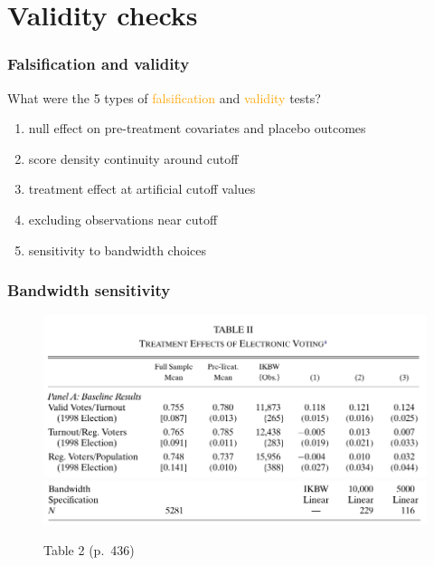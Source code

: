 \documentclass[12pt,english,dvipsnames,aspectratio=169,handout]{beamer}\usepackage[]{graphicx}\usepackage[]{xcolor}
\begin{document}
\section{Validity checks}
 
\begin{frame}
\frametitle{Falsification and validity}

What were the 5 types of \textcolor{orange}{falsification} and \textcolor{orange}{validity} tests?\pause
\bigskip

\begin{enumerate}
\item null effect on pre-treatment covariates and placebo outcomes
\item score density continuity around cutoff
\item treatment effect at artificial cutoff values
\item excluding observations near cutoff
\item sensitivity to bandwidth choices
\end{enumerate}
\end{frame}


\begin{frame}
\frametitle{Bandwidth sensitivity}

\begin{figure}
\centering
\includegraphics[scale=0.4]{../04-figures/07/20-1.PNG}
\includegraphics[scale=0.48]{../04-figures/07/20-3.PNG}
\caption{Table 2 (p.~436)}
\end{figure}

\end{frame}
\end{document}
